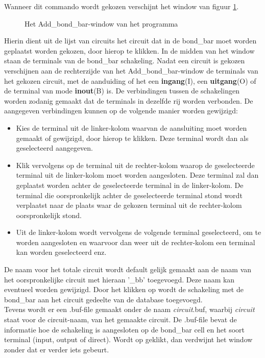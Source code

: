 \begin{itemize}
Wanneer dit commando wordt gekozen verschijnt het window van
figuur \ref{bondbar-window}.
\begin{figure}[htb]
\centerline{}
\caption{Het Add\_bond\_bar-window van het programma }
\label{bondbar-window}
\end{figure}
Hierin dient uit de lijst van circuits het circuit dat in de bond\_bar moet
worden geplaatst worden gekozen, door hierop te klikken.
In de midden van het window staan de terminals van de bond\_bar schakeling.
Nadat een circuit is gekozen verschijnen aan de rechterzijde van het
Add\_bond\_bar-window de terminals van het gekozen circuit, met de aanduiding
of het een {\bf ingang}(I), een {\bf uitgang}(O) of de terminal van mode {\bf inout}(B) is.
De verbindingen tussen de schakelingen worden
                   zodanig gemaakt dat de terminals in dezelfde rij worden
                   verbonden. De aangegeven verbindingen kunnen op de volgende
                   manier worden gewijzigd:
                   \begin{itemize}
                   \item Kies de terminal uit de linker-kolom waarvan de
                         aansluiting moet worden gemaakt of gewij\-zigd, door
                         hierop te klikken. Deze terminal wordt dan als
                         geselecteerd aangegeven.
                   \item Klik vervolgens op de terminal uit de rechter-kolom
                         waarop de geselecteerde terminal uit de linker-kolom
                         moet worden aangesloten. Deze terminal zal dan
                         geplaatst worden achter de ge\-se\-lecteerde terminal
                         in de linker-kolom. De terminal die oorspronkelijk
                         achter de geselecteerde terminal stond wordt verplaatst
                         naar de plaats waar de gekozen terminal uit de
                         rechter-kolom oorspronkelijk stond.
                   \item Uit de linker-kolom wordt vervolgens de volgende
                         terminal geselecteerd, om te worden aange\-sloten en
                         waarvoor dan weer uit de rechter-kolom een
                         terminal kan worden geselecteerd enz.
                   \end{itemize}
De naam voor het totale circuit wordt default gelijk gemaakt aan de naam van
het oorspronke\-lij\-ke circuit met hieraan '\_bb' toegevoegd.
Deze naam kan eventueel worden gewijzigd.
Door het klikken op  wordt de schakeling met de bond\_bar aan het circuit
gedeelte van de  database toegevoegd.\\
Tevens wordt er een .buf-file gemaakt onder de naam
{\it circuit}.buf, waarbij {\it circuit} staat voor de circuit-naam,
van het gemaakte circuit.
De .buf-file bevat de informatie hoe de schakeling is aangesloten op de
bond\_bar cell en het soort terminal (input, output of direct).
Wordt op  geklikt, dan verdwijnt het
window zonder dat er verder iets gebeurt.


\end{itemize}
